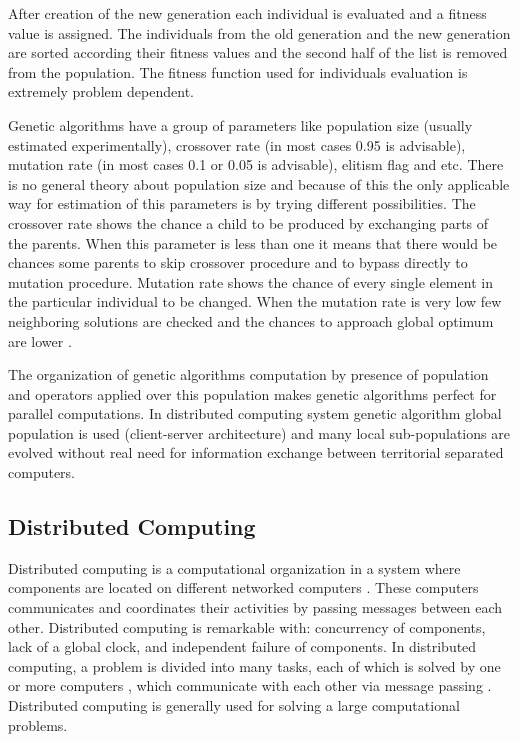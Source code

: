 \documentclass[graybox]{svmult}
\begin{document}
After creation of the new generation each individual is evaluated and a fitness value is assigned. The individuals from the old generation and the new generation are sorted according their fitness values and the second half of the list is removed from the population. The fitness function used for individuals evaluation is extremely problem dependent. 

Genetic algorithms have a group of parameters like population size (usually estimated experimentally), crossover rate (in most cases 0.95 is advisable), mutation rate (in most cases 0.1 or 0.05 is advisable), elitism flag and etc. There is no general theory about population size and because of this the only applicable way for estimation of this parameters is by trying different possibilities. The crossover rate shows the chance a child to be produced by exchanging parts of the parents. When this parameter is less than one it means that there would be chances some parents to skip crossover procedure and to bypass directly to mutation procedure. Mutation rate shows the chance of every single element in the particular individual to be changed. When the mutation rate is very low few neighboring solutions are checked and the chances to approach global optimum are lower \cite{cheng01, kapanova01}. 

The organization of genetic algorithms computation by presence of population and operators applied over this population makes genetic algorithms perfect for parallel computations. In distributed computing system genetic algorithm global population is used (client-server architecture) and many local sub-populations are evolved without real need for information exchange between territorial separated computers. 

\subsection{Distributed Computing} \label{Distributed Computing}

Distributed computing is a computational organization in a system where components are located on different networked computers \cite{balabanov01}. These computers communicates and coordinates their activities by passing messages between each other. Distributed computing is remarkable with: concurrency of components, lack of a global clock, and independent failure of components. In distributed computing, a problem is divided into many tasks, each of which is solved by one or more computers \cite{godfrey01}, which communicate with each other via message passing \cite{andrews01}. Distributed computing is generally used for solving a large computational problems. 
\end{document}
